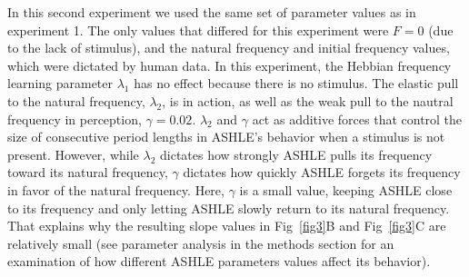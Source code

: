 \documentclass[10pt,letterpaper]{article}
\begin{document}
In this second experiment we used the same set of parameter values as in experiment 1. The only values that differed for this experiment were $F = 0$ (due to the lack of stimulus), and the natural frequency and initial frequency values, which were dictated by human data. In this experiment, the Hebbian frequency learning parameter $\lambda_1$ has no effect because there is no stimulus. The elastic pull to the natural frequency, $\lambda_2$, is in action, as well as the weak pull to the nautral frequency in perception, $\gamma = 0.02$. $\lambda_2$ and $\gamma$ act as additive forces that control the size of consecutive period lengths in ASHLE's behavior when a stimulus is not present. However, while $\lambda_2$ dictates how strongly ASHLE pulls its frequency toward its natural frequency, $\gamma$ dictates how quickly ASHLE forgets its frequency in favor of the natural frequency. Here, $\gamma$ is a small value, keeping ASHLE close to its frequency and only letting ASHLE slowly return to its natural frequency. That explains why the resulting slope values in Fig~\ref{fig3}B and Fig~\ref{fig3}C are relatively small (see parameter analysis in the methods section for an examination of how different ASHLE parameters values affect its behavior).
\end{document}
